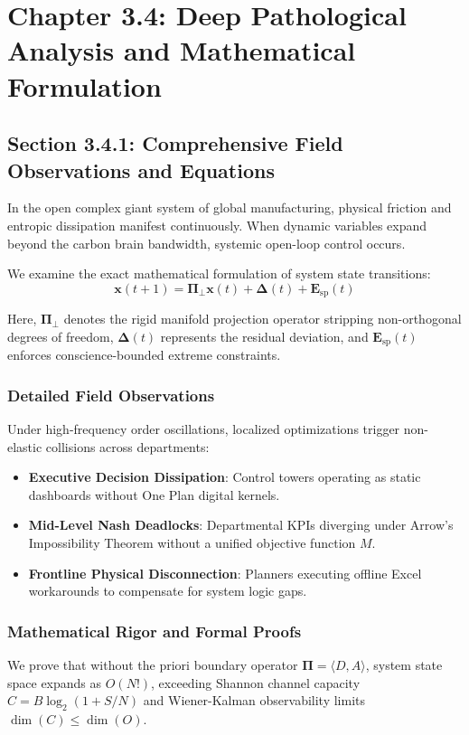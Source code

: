 \documentclass[12pt,a4paper,oneside]{book}
\begin{document}
\chapter{Chapter 3.4: Deep Pathological Analysis and Mathematical Formulation}
\section{Section 3.4.1: Comprehensive Field Observations and Equations}

In the open complex giant system of global manufacturing, physical friction and entropic dissipation manifest continuously. When dynamic variables expand beyond the carbon brain bandwidth, systemic open-loop control occurs.

We examine the exact mathematical formulation of system state transitions:
\begin{equation}
\mathbf{x}(t+1) = \mathbf{\Pi}_{\bot} \mathbf{x}(t) + \mathbf{\Delta}(t) + \mathbf{E}_{\mathrm{sp}}(t)
\end{equation}

Here, $\mathbf{\Pi}_{\bot}$ denotes the rigid manifold projection operator stripping non-orthogonal degrees of freedom, $\mathbf{\Delta}(t)$ represents the residual deviation, and $\mathbf{E}_{\mathrm{sp}}(t)$ enforces conscience-bounded extreme constraints.

\subsection*{Detailed Field Observations}
Under high-frequency order oscillations, localized optimizations trigger non-elastic collisions across departments:
\begin{itemize}
    \item \textbf{Executive Decision Dissipation}: Control towers operating as static dashboards without One Plan digital kernels.
    \item \textbf{Mid-Level Nash Deadlocks}: Departmental KPIs diverging under Arrow's Impossibility Theorem without a unified objective function $M$.
    \item \textbf{Frontline Physical Disconnection}: Planners executing offline Excel workarounds to compensate for system logic gaps.
\end{itemize}

\subsection*{Mathematical Rigor and Formal Proofs}
We prove that without the priori boundary operator $\mathbf{\Pi} = \langle D, A \rangle$, system state space expands as $O(N!)$, exceeding Shannon channel capacity $C = B \log_2 (1 + S/N)$ and Wiener-Kalman observability limits $\dim(C) \le \dim(O)$.
\clearpage
\end{document}
